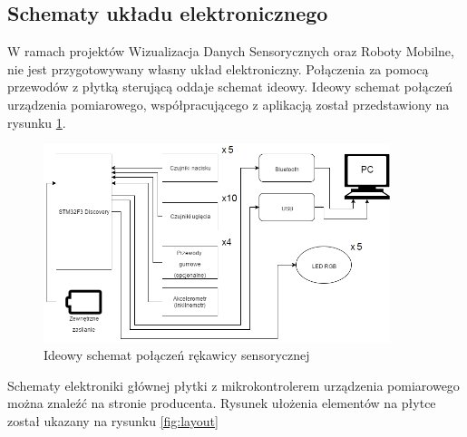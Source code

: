 \documentclass[10pt,a4paper]{article}
\begin{document}
\subsection{Schematy układu elektronicznego}
W ramach projektów Wizualizacja Danych Sensorycznych oraz Roboty Mobilne, nie jest przygotowywany własny układ elektroniczny. Połączenia za pomocą przewodów z płytką sterującą oddaje schemat ideowy.
Ideowy schemat połączeń urządzenia pomiarowego, współpracującego z aplikacją został przedstawiony na rysunku \ref{fig:ideascheme}.
\begin{figure}[!htb]
\centering
\includegraphics[width=0.9\textwidth]{./SchematIdeowy.png}
\caption{Ideowy schemat połączeń rękawicy sensorycznej\label{fig:ideascheme}}
\end{figure}
Schematy elektroniki głównej płytki z mikrokontrolerem urządzenia pomiarowego można znaleźć na stronie producenta. Rysunek ułożenia elementów na płytce został ukazany na rysunku \ref{fig:layout}
\end{document}
